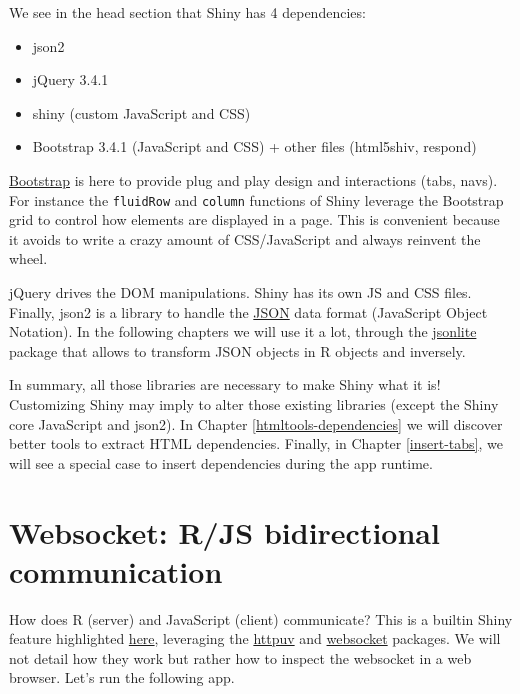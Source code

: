 \documentclass[]{book}
\providecommand{\tightlist}{%
  \setlength{\itemsep}{0pt}\setlength{\parskip}{0pt}}
\begin{document}
We see in the head section that Shiny has 4 dependencies:

\begin{itemize}
\tightlist
\item
  json2
\item
  jQuery 3.4.1
\item
  shiny (custom JavaScript and CSS)
\item
  Bootstrap 3.4.1 (JavaScript and CSS) + other files (html5shiv, respond)
\end{itemize}

\href{https://getbootstrap.com}{Bootstrap} is here to provide plug and play design and interactions (tabs, navs). For instance the \texttt{fluidRow} and \texttt{column} functions of Shiny leverage the Bootstrap grid to control how elements are displayed in a page. This is convenient because it avoids to write a crazy amount of CSS/JavaScript and always reinvent the wheel.

jQuery drives the DOM manipulations. Shiny has its own JS and CSS files. Finally, json2 is a library to handle the \href{https://www.json.org/json-en.html}{JSON} data format (JavaScript Object Notation). In the following chapters we will use it a lot, through the \href{https://cran.r-project.org/web/packages/jsonlite/index.html}{jsonlite} package that allows to transform JSON objects in R objects and inversely.

In summary, all those libraries are necessary to make Shiny what it is! Customizing Shiny may imply to alter those existing libraries (except the Shiny core JavaScript and json2). In Chapter \ref{htmltools-dependencies} we will discover better tools to extract HTML dependencies. Finally, in Chapter \ref{insert-tabs}, we will see a special case to insert dependencies during the app runtime.

\hypertarget{websocket-rjs-bidirectional-communication}{%
\section{Websocket: R/JS bidirectional communication}\label{websocket-rjs-bidirectional-communication}}

How does R (server) and JavaScript (client) communicate? This is a builtin Shiny feature highlighted \href{Fast\%20bidirectional\%20communication\%20between\%20the\%20web\%20browser\%20and\%20R\%20using\%20the\%20httpuv\%20package.}{here}, leveraging the \href{https://github.com/rstudio/httpuv}{httpuv} and \href{https://github.com/rstudio/websocket}{websocket} packages. We will not detail how they work but rather how to inspect the websocket in a web browser. Let's run the following app.
\end{document}
